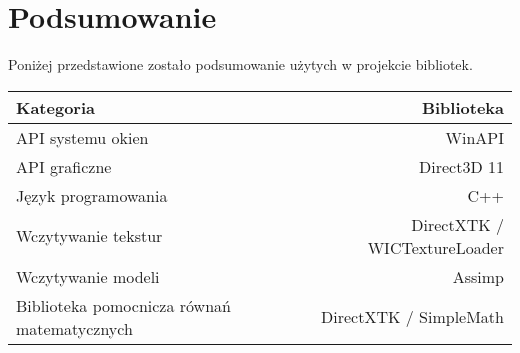 \section{Podsumowanie}

Poniżej przedstawione zostało podsumowanie użytych w projekcie
bibliotek.

\begin{center}
	\begin{tabular}{ |l r| }
		\hline
		\textbf{Kategoria} & \textbf{Biblioteka} \\
		\hline
		API systemu okien & WinAPI \\
		API graficzne & Direct3D 11 \\
		Język programowania & C++ \\ 
		Wczytywanie tekstur & DirectXTK / WICTextureLoader \\
		Wczytywanie modeli & Assimp \\
		Biblioteka pomocnicza równań matematycznych & DirectXTK / SimpleMath \\
		\hline
	\end{tabular}
\end{center}